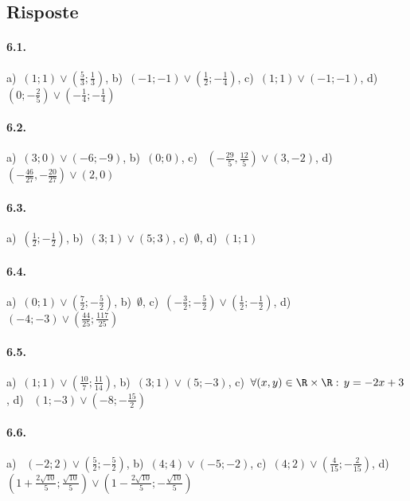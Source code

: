\subsection{Risposte}
\paragraph{6.1.} 
a)~\(\left(1;1\right)\vee \left(\frac 5 3;\frac 1 3\right)\),\quad 
b)~\(\left(-1;-1\right)\vee \left(\frac 1 2;-\frac 1 4\right)\),\quad 
c)~\(\left(1;1\right)\vee \left(-1;-1\right)\),\quad 
d)~\(\left(0;-\frac 2 5\right)\vee \left(-\frac 1 4;-\frac 1 4\right)\)

\paragraph{6.2.} 
a)~\(\left(3;0\right)\vee \left(-6;-9\right)\),\quad 
b)~\(\left(0;0\right)\),\quad 
c)~ \(\left(-\frac{29} 5,\frac{12} 5\right)\vee (3,-2)\),\quad 
d)~\(\left(-\frac{46}{27},-\frac{20}{27}\right)\vee (2,0)\)

\paragraph{6.3.} 
a)~\(\left(\frac 1 2;-\frac 1 2\right)\),\quad 
b)~\(\left(3;1\right)\vee \left(5;3\right)\),\quad 
c)~\(\emptyset \),\quad 
d)~\(\left(1;1\right)\)

\paragraph{6.4.} 
a)~\(\left(0;1\right)\vee \left(\frac 7 2;-\frac 5 2\right)\),\quad 
b)~\(\emptyset \),\quad 
c)~\(\left(-\frac 3 2;
-\frac 5 2\right)\vee \left(\frac 1 2;-\frac 1 2\right)\),\quad 
d)~\(\left(-4;-3\right)\vee \left(\frac{44}{25};\frac{117}{25}\right)\)

\paragraph{6.5.} 
a)~\(\left(1;1\right)\vee \left(\frac{10} 7;\frac{11}{14}\right)\),\quad 
b)~\(\left(3;1\right)\vee \left(5;-3\right)\),\quad 
c)~\( \forall (x,y)\in \R \times \R:\,y=-2x+3\),\quad 
d)~ \(\left(1;-3\right)\vee \left(-8;-\frac{15} 2\right)\)

\paragraph{6.6.} 
a)~ \(\left(-2;2\right)\vee \left(\frac 5 2;-\frac 5 2\right)\),\quad 
b)~\(\left(4;4\right)\vee \left(-5;-2\right)\),\quad 
c)~\(\left(4;2\right)\vee \left(\frac 4{15};-\frac 2{15}\right)\),\quad 
d)~\(\left(1+\frac{2\sqrt{10}} 5;\frac{\sqrt{10}} 5\right)\vee 
\left(1-\frac{2\sqrt{10}} 5;-\frac{\sqrt{10}} 5\right)\)

